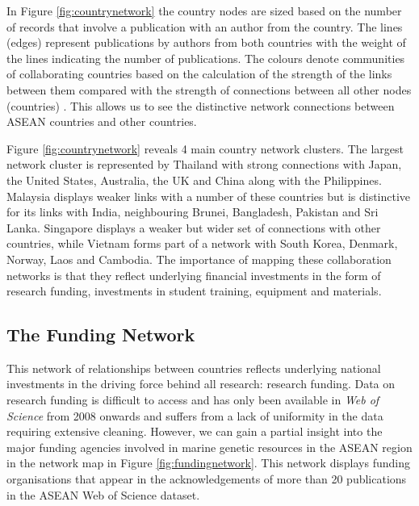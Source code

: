 \documentclass[]{book}
\theoremstyle{definition}
\theoremstyle{definition}
\theoremstyle{definition}
\theoremstyle{remark}
\begin{document}
In Figure \ref{fig:countrynetwork} the country nodes are sized based on
the number of records that involve a publication with an author from the
country. The lines (edges) represent publications by authors from both
countries with the weight of the lines indicating the number of
publications. The colours denote communities of collaborating countries
based on the calculation of the strength of the links between them
compared with the strength of connections between all other nodes
(countries) \citep{Blondel_2008}. This allows us to see the distinctive
network connections between ASEAN countries and other countries.

Figure \ref{fig:countrynetwork} reveals 4 main country network clusters.
The largest network cluster is represented by Thailand with strong
connections with Japan, the United States, Australia, the UK and China
along with the Philippines. Malaysia displays weaker links with a number
of these countries but is distinctive for its links with India,
neighbouring Brunei, Bangladesh, Pakistan and Sri Lanka. Singapore
displays a weaker but wider set of connections with other countries,
while Vietnam forms part of a network with South Korea, Denmark, Norway,
Laos and Cambodia. The importance of mapping these collaboration
networks is that they reflect underlying financial investments in the
form of research funding, investments in student training, equipment and
materials.

\hypertarget{the-funding-network}{%
\subsection{The Funding Network}\label{the-funding-network}}

This network of relationships between countries reflects underlying
national investments in the driving force behind all research: research
funding. Data on research funding is difficult to access and has only
been available in \emph{Web of Science} from 2008 onwards and suffers
from a lack of uniformity in the data requiring extensive cleaning.
However, we can gain a partial insight into the major funding agencies
involved in marine genetic resources in the ASEAN region in the network
map in Figure \ref{fig:fundingnetwork}. This network displays funding
organisations that appear in the acknowledgements of more than 20
publications in the ASEAN Web of Science dataset.
\end{document}
